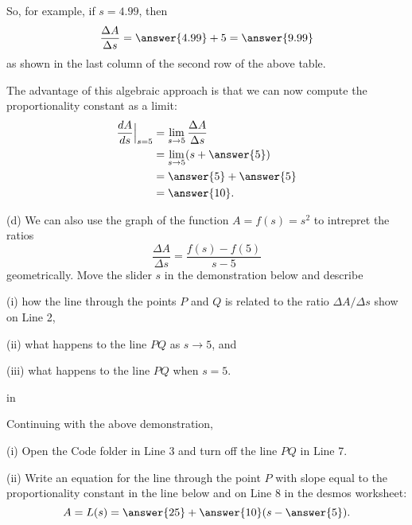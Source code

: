 \documentclass{ximera}
\newcommand{\pskip}{\vskip 0.1 in}
\begin{document}
\begin{question}
So, for example, if $s=4.99$, then
\[
\frac{\Delta A}{\Delta s} = \answer{4.99} + 5 = \answer{9.99} 
\]
as shown in the last column of the second row of the above table.

The advantage of this algebraic approach is that we can now compute the proportionality constant as a limit:
\begin{align*}
                    \frac{dA}{ds}\Big|_{s=5} &= \lim_{s\to 5} \frac{\Delta A}{\Delta s} \\
                                                         &=  \lim_{s\to 5} (s+\answer{5}) \\
                                                         &= \answer{5} + \answer{5} \\
                                                           &= \answer{10} .
\end{align*}

(d) We can also use the graph of the function $A=f(s)=s^2$ to intrepret the ratios 
\[
  \frac{\Delta A}{\Delta s} = \frac{f(s) - f(5)}{s-5} 
\]
geometrically. Move the slider $s$ in the demonstration below and describe

(i) how the line through the points $P$ and $Q$ is related to the ratio $\Delta A/\Delta s$ show on Line 2, 

(ii) what happens to the line $PQ$ as $s\to 5$, and

(iii) what happens to the line $PQ$ when $s=5$.

\begin{freeResponse}
\end{freeResponse}

 
\begin{onlineOnly}
    \begin{center}
\end{center}
\end{onlineOnly}

\pskip

Continuing with the above demonstration, 

(i) Open the Code folder in Line 3 and turn off the line $PQ$ in Line 7.

(ii) Write an equation for the line through the point $P$ with slope equal to the proportionality constant in the line below and on Line 8 in the desmos worksheet:
\[
    A = L(s) = \answer{25}+ \answer{10}(s- \answer{5}) .
\]


\end{question}
\end{document}
